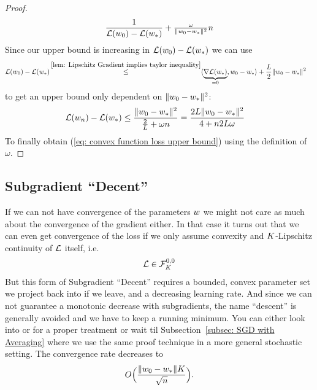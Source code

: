 \begin{proof}
\begin{align*}
{			\frac{1}{\Loss(\weights_0)-\Loss(\minimum)} + \tfrac{\omega}{\|\weights_0-\minimum\|^2}n
		}
	\end{align*}
	Since our upper bound is increasing in \(\Loss(\weights_0)-\Loss(\minimum)\)
	we can use
	\begin{align*}
		\Loss(\weights_0) - \Loss(\minimum)
		&\xle{\ref{lem: Lipschitz Gradient implies taylor inequality}}
		\langle\underbrace{\nabla\Loss(\minimum)}_{=0}, \weights_0 - \minimum\rangle
		+\frac{\ubound}{2}\|\weights_0-\minimum\|^2
	\end{align*}
	to get an upper bound only dependent on \(\|\weights_0 - \minimum\|^2\):
	\begin{align*}
		\Loss(\weights_n)-\Loss(\minimum)
		&\le \frac{\|\weights_0-\minimum\|^2}{
			\frac{2}{\ubound} + \omega n
		}
		= \frac{2\ubound\|\weights_0-\minimum\|^2}{
			4 + n 2\ubound \omega
		}
	\end{align*}
	To finally obtain (\ref{eq: convex function loss upper bound}) using the
	definition of \(\omega\).
\end{proof}

\subsection{Subgradient ``Decent''}\label{subsec: subgradient method}
If we can not have convergence of the parameters \(\weights\) we might not
care as much about the convergence of the gradient either. In that case it
turns out that we can even get convergence of the loss if we only assume
convexity and \(\lipConst\)-Lipschitz continuity of \(\Loss\) itself, i.e.
\begin{align*}
	\Loss \in \lipGradientSet[0,0]{\lipConst}
\end{align*}
%
But this form of Subgradient ``Decent''
requires a bounded, convex parameter set we project back into if we leave, and
a decreasing learning rate. And since we can not guarantee a monotonic decrease
with subgradients, the name ``descent'' is generally avoided and we have to keep
a running minimum. You can either look into \textcite[Section
3.2.3]{nesterovLecturesConvexOptimization2018} or \textcite[Section
3.1]{bubeckConvexOptimizationAlgorithms2015} for a proper
treatment or wait til Subsection~\ref{subsec: SGD with Averaging} where we use
the same proof technique in a more general stochastic setting. The convergence
rate decreases to
\begin{align*}
	O\Big(\frac{\|\weights_0-\weights_*\|\lipConst}{\sqrt{n}}\Big).
\end{align*}

